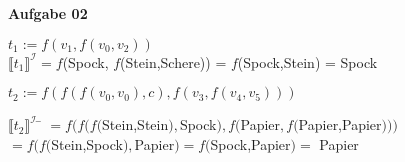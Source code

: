 \documentclass[a4paper,10pt]{article}
\begin{document}
	\textbf{Aufgabe 02}\\
	\begin{compactitem}
		\item $ t_1 := f(v_1,f(v_0,v_2)) $\\
		
		$ \llbracket t_1\rrbracket^\mathcal{I} =  f$(Spock, $f$(Stein,Schere)) = $f$(Spock,Stein) = Spock \\
		
		\item $ t_2 := f(f(f(v_0,v_0),c),f(v_3,f(v_4,v_5))) $\\
		\begin{tabbing}
			$ \llbracket t_2\rrbracket^\mathcal{I}$
			\= $ = f(f(f($Stein,Stein$),$Spock$),f($Papier$, f($Papier,Papier$)))$ \\
			\> $= f(f($Stein,Spock$),$Papier$) = f($Spock,Papier$) = $ Papier 
		\end{tabbing}
	\end{compactitem} \
	\newpage
	
\end{document}
